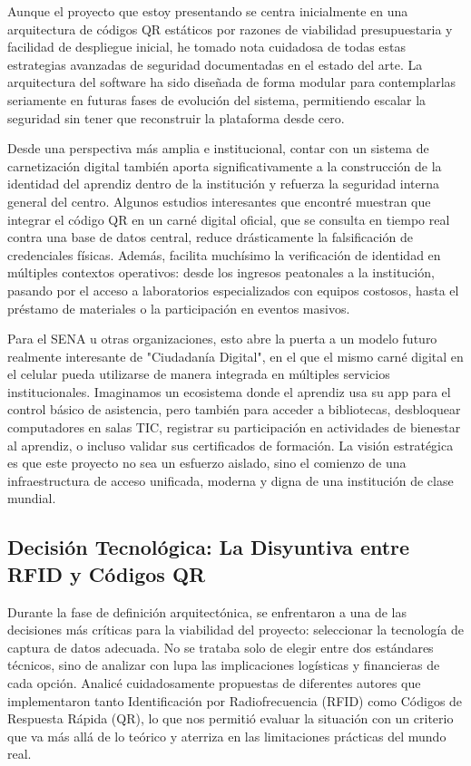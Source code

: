 Aunque el proyecto que estoy presentando se centra inicialmente en una arquitectura de códigos QR estáticos por razones de viabilidad presupuestaria y facilidad de despliegue inicial, he tomado nota cuidadosa de todas estas estrategias avanzadas de seguridad documentadas en el estado del arte. La arquitectura del software ha sido diseñada de forma modular para contemplarlas seriamente en futuras fases de evolución del sistema, permitiendo escalar la seguridad sin tener que reconstruir la plataforma desde cero.

Desde una perspectiva más amplia e institucional, contar con un sistema de carnetización digital también aporta significativamente a la construcción de la identidad del aprendiz dentro de la institución y refuerza la seguridad interna general del centro. Algunos estudios interesantes que encontré muestran que integrar el código QR en un carné digital oficial, que se consulta en tiempo real contra una base de datos central, reduce drásticamente la falsificación de credenciales físicas. Además, facilita muchísimo la verificación de identidad en múltiples contextos operativos: desde los ingresos peatonales a la institución, pasando por el acceso a laboratorios especializados con equipos costosos, hasta el préstamo de materiales o la participación en eventos masivos.

Para el SENA u otras organizaciones, esto abre la puerta a un modelo futuro realmente interesante de "Ciudadanía Digital", en el que el mismo carné digital en el celular pueda utilizarse de manera integrada en múltiples servicios institucionales. Imaginamos un ecosistema donde el aprendiz usa su app para el control básico de asistencia, pero también para acceder a bibliotecas, desbloquear computadores en salas TIC, registrar su participación en actividades de bienestar al aprendiz, o incluso validar sus certificados de formación. La visión estratégica es que este proyecto no sea un esfuerzo aislado, sino el comienzo de una infraestructura de acceso unificada, moderna y digna de una institución de clase mundial.

\subsection{Decisión Tecnológica: La Disyuntiva entre RFID y Códigos QR}

Durante la fase de definición arquitectónica, se enfrentaron a una de las decisiones más críticas para la viabilidad del proyecto: seleccionar la tecnología de captura de datos adecuada. No se trataba solo de elegir entre dos estándares técnicos, sino de analizar con lupa las implicaciones logísticas y financieras de cada opción. Analicé cuidadosamente propuestas de diferentes autores que implementaron tanto Identificación por Radiofrecuencia (RFID) como Códigos de Respuesta Rápida (QR), lo que nos permitió evaluar la situación con un criterio que va más allá de lo teórico y aterriza en las limitaciones prácticas del mundo real.

